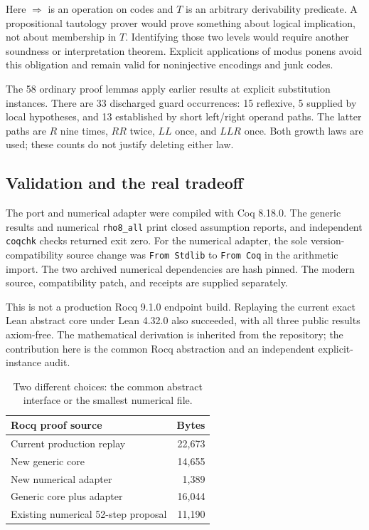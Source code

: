 \documentclass[11pt,letterpaper]{article}
\newcommand{\code}[1]{\texttt{\small #1}}
\begin{document}
Here \(\Rightarrow\) is an operation on codes and \(T\) is an arbitrary derivability
predicate. A propositional tautology prover would prove something about logical
implication, not about membership in \(T\). Identifying those two levels would require
another soundness or interpretation theorem. Explicit applications of modus ponens
avoid this obligation and remain valid for noninjective encodings and junk codes.

The 58 ordinary proof lemmas apply earlier results at explicit substitution instances.
There are 33 discharged guard occurrences: 15 reflexive, 5 supplied by local hypotheses,
and 13 established by short left/right operand paths. The latter paths are
\(R\) nine times, \(RR\) twice, \(LL\) once, and \(LLR\) once. Both growth laws are
used; these counts do not justify deleting either law.

\subsection{Validation and the real tradeoff}

The port and numerical adapter were compiled with Coq 8.18.0. The generic results
and numerical \code{rho8\_all} print closed assumption reports, and independent
\code{coqchk} checks returned exit zero. For the numerical adapter, the sole
version-compatibility source change was \code{From Stdlib} to \code{From Coq} in
the arithmetic import. The two archived numerical dependencies are hash pinned.
The modern source, compatibility patch, and receipts are supplied separately.

This is not a production Rocq 9.1.0 endpoint build. Replaying the current exact Lean
abstract core under Lean 4.32.0 also succeeded, with all three public results axiom-free.
The mathematical derivation is inherited from the repository; the contribution here
is the common Rocq abstraction and an independent explicit-instance audit.

\begin{table}[ht]
\centering\small
\begin{tabular}{@{}lr@{}}
\toprule
Rocq proof source & Bytes\\
\midrule
Current production replay & 22,673\\
New generic core & 14,655\\
New numerical adapter & 1,389\\
Generic core plus adapter & 16,044\\
Existing numerical 52-step proposal & 11,190\\
\bottomrule
\end{tabular}
\caption{Two different choices: the common abstract interface or the smallest numerical file.}
\end{table}
\end{document}

